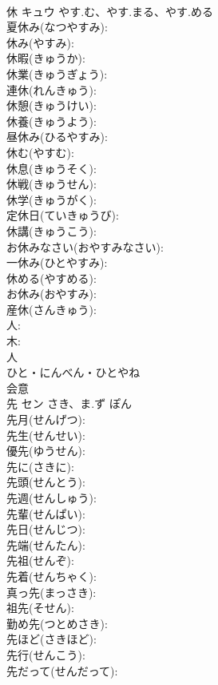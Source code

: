 \documentclass[8pt]{extreport}
\begin{document}
\begin{CJK}{UTF8}{min}
\\	休	キュウ	やす.む、やす.まる、やす.める		
\\	夏休み(なつやすみ): 
\\	休み(やすみ): 
\\	休暇(きゅうか): 
\\	休業(きゅうぎょう): 
\\	連休(れんきゅう): 
\\	休憩(きゅうけい): 
\\	休養(きゅうよう): 
\\	昼休み(ひるやすみ): 
\\	休む(やすむ): 
\\	休息(きゅうそく): 
\\	休戦(きゅうせん): 
\\	休学(きゅうがく): 
\\	定休日(ていきゅうび): 
\\	休講(きゅうこう): 
\\	お休みなさい(おやすみなさい): 
\\	一休み(ひとやすみ): 
\\	休める(やすめる): 
\\	お休み(おやすみ): 
\\	産休(さんきゅう): 
\\	人: 
\\	木: 
\\	人	
\\	ひと・にんべん・ひとやね	
\\	会意 
\\	先	セン	さき、ま.ず	ぽん	
\\	先月(せんげつ): 
\\	先生(せんせい): 
\\	優先(ゆうせん): 
\\	先に(さきに): 
\\	先頭(せんとう): 
\\	先週(せんしゅう): 
\\	先輩(せんぱい): 
\\	先日(せんじつ): 
\\	先端(せんたん): 
\\	先祖(せんぞ): 
\\	先着(せんちゃく): 
\\	真っ先(まっさき): 
\\	祖先(そせん): 
\\	勤め先(つとめさき): 
\\	先ほど(さきほど): 
\\	先行(せんこう): 
\\	先だって(せんだって): 

\end{CJK}
\end{document}
